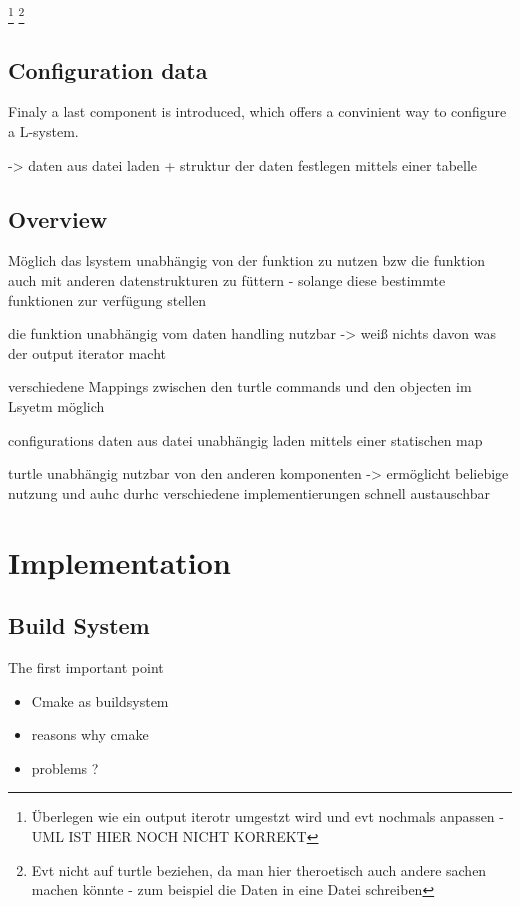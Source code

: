 \documentclass[english]{cpp-hmwk}
\begin{document}
\footnote{Überlegen wie ein output iterotr umgestzt wird und evt nochmals anpassen - UML IST HIER NOCH NICHT KORREKT}
\footnote{Evt nicht auf turtle beziehen, da man hier theroetisch auch andere sachen machen könnte - zum beispiel die Daten in eine Datei schreiben}


\subsection{Configuration data}
Finaly a last component is introduced, which offers a convinient way to configure a L-system. 

-> daten aus datei laden + struktur der daten festlegen mittels einer tabelle

\subsection{Overview}

Möglich das lsystem unabhängig von der funktion zu nutzen bzw die funktion auch mit anderen datenstrukturen zu füttern - solange diese bestimmte funktionen zur verfügung stellen

die funktion unabhängig vom daten handling nutzbar -> weiß nichts davon was der output iterator macht

verschiedene Mappings zwischen den turtle commands und den objecten im Lsyetm möglich

configurations daten aus datei unabhängig laden mittels einer statischen map

turtle unabhängig nutzbar von den anderen komponenten -> ermöglicht beliebige nutzung und auhc durhc verschiedene implementierungen schnell austauschbar


\pagebreak

\section{Implementation}
\label{section:impl}
\subsection{Build System}
\label{section:buildsystem}
The first important point 

\begin{itemize}
	\item Cmake as buildsystem
	\item reasons why cmake
	\item problems ?
\end{itemize}
\end{document}
